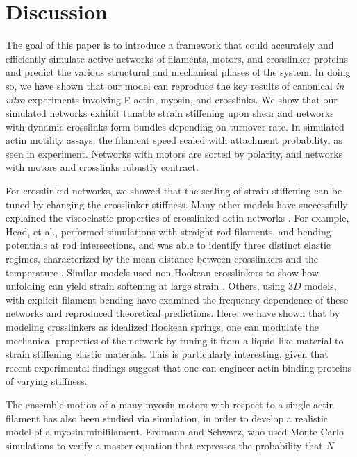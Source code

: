 \documentclass[12pt]{article}
\begin{document}
\section{Discussion}
The goal of this paper is to introduce a framework that could accurately and
efficiently simulate active networks of filaments, motors, and crosslinker 
proteins and predict the various structural and mechanical phases of the system.
In doing so, we have shown that our model can reproduce the key results of 
canonical \textit{in vitro} experiments involving F-actin, myosin, and 
crosslinks. We show that our simulated networks exhibit tunable strain 
stiffening upon shear,and networks with dynamic crosslinks form bundles 
depending on turnover rate. In simulated actin motility assays, the filament 
speed scaled with attachment probability, as seen in experiment. Networks with 
motors are sorted by polarity, and networks with motors and crosslinks robustly
contract. 
\par
For crosslinked networks, we showed that the scaling of strain stiffening can be
tuned by changing the crosslinker stiffness. Many other models have successfully
explained the viscoelastic properties of crosslinked actin networks
\cite{mackintosh1995, gittes1998, head2003, wilhelm2003, kim2009}.  
For example, Head, et al., performed simulations with straight rod filaments, 
and bending potentials at rod intersections, and was able to identify three 
distinct elastic regimes, characterized by the mean distance between
crosslinkers and the temperature \cite{head2003}. Similar models used 
non-Hookean crosslinkers to show how unfolding can yield strain softening at
large strain \cite{didonna2007}. Others, using $3D$ models, with explicit
filament bending have examined the frequency dependence of these networks 
and reproduced theoretical predictions\cite{kim2009,muller2014}.
Here, we have shown that by modeling crosslinkers as idealized Hookean springs, 
one can modulate the mechanical properties of the network by tuning it from 
a liquid-like material to strain stiffening elastic materials. 
This is particularly interesting, given that recent experimental findings
suggest that one can engineer actin binding proteins of varying
stiffness\cite{vieregg2016}.  
\par
The ensemble motion of a many myosin motors with respect to a single actin
filament has also been studied via simulation, in order to develop a realistic
model of a myosin minifilament. Erdmann and Schwarz, who used Monte Carlo
simulations to verify a master equation that expresses the probability that $N$
\end{document}
